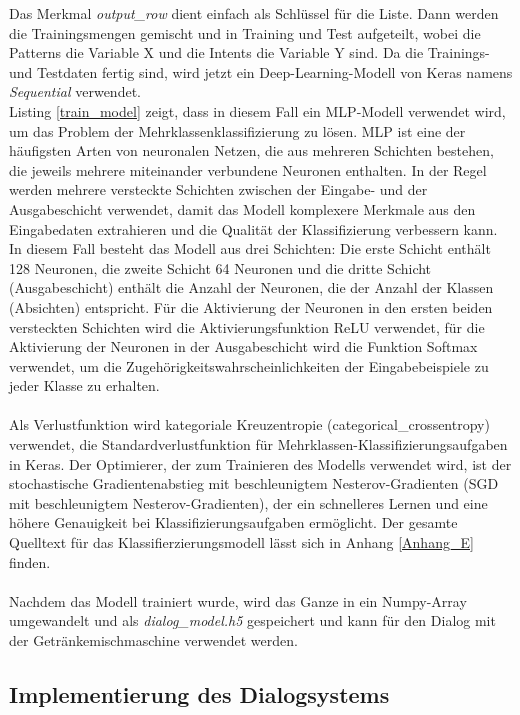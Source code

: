 Das Merkmal \textit{output\_row} dient einfach als Schlüssel für die Liste. 
Dann werden die Trainingsmengen gemischt und in Training und Test aufgeteilt, wobei die Patterns die Variable X und die Intents die Variable Y sind. 
Da die Trainings- und Testdaten fertig sind, wird jetzt ein Deep-Learning-Modell von Keras namens \textit{Sequential} verwendet.\\

Listing \ref{train_model} zeigt, dass in diesem Fall ein \ac{MLP}-Modell verwendet wird, um das Problem der Mehrklassenklassifizierung zu lösen. 
\ac{MLP} ist eine der häufigsten Arten von neuronalen Netzen, die aus mehreren Schichten bestehen, die jeweils mehrere miteinander verbundene Neuronen enthalten. 
In der Regel werden mehrere versteckte Schichten zwischen der Eingabe- und der Ausgabeschicht verwendet, damit das Modell komplexere Merkmale aus den Eingabedaten extrahieren und die Qualität der Klassifizierung verbessern kann. 
In diesem Fall besteht das Modell aus drei Schichten: Die erste Schicht enthält 128 Neuronen, die zweite Schicht 64 Neuronen und die dritte Schicht (Ausgabeschicht) enthält die Anzahl der Neuronen, die der Anzahl der Klassen (Absichten) entspricht. 
Für die Aktivierung der Neuronen in den ersten beiden versteckten Schichten wird die Aktivierungsfunktion \ac{ReLU} verwendet, für die Aktivierung der Neuronen in der Ausgabeschicht wird die Funktion Softmax verwendet, um die Zugehörigkeitswahrscheinlichkeiten der Eingabebeispiele zu jeder Klasse zu erhalten.\\\\
Als Verlustfunktion wird kategoriale Kreuzentropie (categorical\_crossentropy) verwendet, die Standardverlustfunktion für Mehrklassen-Klassifizierungsaufgaben in Keras. 
Der Optimierer, der zum Trainieren des Modells verwendet wird, ist der stochastische Gradientenabstieg mit beschleunigtem Nesterov-Gradienten (SGD mit beschleunigtem Nesterov-Gradienten), der ein schnelleres Lernen und eine höhere Genauigkeit bei Klassifizierungsaufgaben ermöglicht. Der gesamte Quelltext für das Klassifierzierungsmodell lässt sich in Anhang \ref{Anhang_E} finden.\\\\
Nachdem das Modell trainiert wurde, wird das Ganze in ein Numpy-Array umgewandelt und als \textit{dialog\_model.h5} gespeichert und kann für den Dialog mit der Getränkemischmaschine verwendet werden.
\subsection{Implementierung des Dialogsystems}
